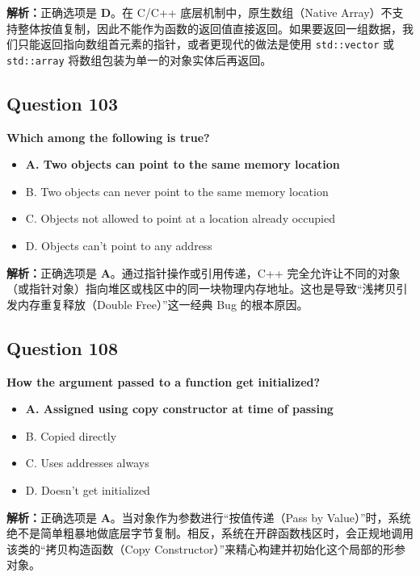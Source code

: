 \documentclass[11pt, a4paper]{article}
\begin{document}
\textbf{解析：}正确选项是 \textbf{D}。在 C/C++ 底层机制中，原生数组（Native Array）不支持整体按值复制，因此不能作为函数的返回值直接返回。如果要返回一组数据，我们只能返回指向数组首元素的指针，或者更现代的做法是使用 \texttt{std::vector} 或 \texttt{std::array} 将数组包装为单一的对象实体后再返回。


\subsection*{Question 103}
\textbf{Which among the following is true?}
\begin{itemize}
    \item \textbf{A. Two objects can point to the same memory location}
    \item B. Two objects can never point to the same memory location
    \item C. Objects not allowed to point at a location already occupied
    \item D. Objects can’t point to any address
\end{itemize}

\textbf{解析：}正确选项是 \textbf{A}。通过指针操作或引用传递，C++ 完全允许让不同的对象（或指针对象）指向堆区或栈区中的同一块物理内存地址。这也是导致“浅拷贝引发内存重复释放（Double Free）”这一经典 Bug 的根本原因。


\subsection*{Question 108}
\textbf{How the argument passed to a function get initialized?}
\begin{itemize}
    \item \textbf{A. Assigned using copy constructor at time of passing}
    \item B. Copied directly
    \item C. Uses addresses always
    \item D. Doesn’t get initialized
\end{itemize}

\textbf{解析：}正确选项是 \textbf{A}。当对象作为参数进行“按值传递（Pass by Value）”时，系统绝不是简单粗暴地做底层字节复制。相反，系统在开辟函数栈区时，会正规地调用该类的“拷贝构造函数（Copy Constructor）”来精心构建并初始化这个局部的形参对象。
\end{document}
